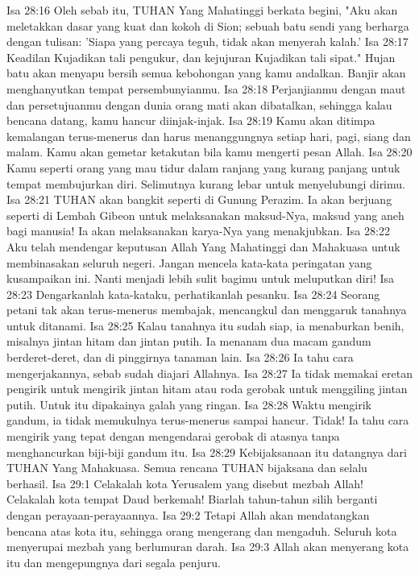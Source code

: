Isa 28:16  Oleh sebab itu, TUHAN Yang Mahatinggi berkata begini, "Aku akan meletakkan dasar yang kuat dan kokoh di Sion; sebuah batu sendi yang berharga dengan tulisan: 'Siapa yang percaya teguh, tidak akan menyerah kalah.'
Isa 28:17  Keadilan Kujadikan tali pengukur, dan kejujuran Kujadikan tali sipat." Hujan batu akan menyapu bersih semua kebohongan yang kamu andalkan. Banjir akan menghanyutkan tempat persembunyianmu.
Isa 28:18  Perjanjianmu dengan maut dan persetujuanmu dengan dunia orang mati akan dibatalkan, sehingga kalau bencana datang, kamu hancur diinjak-injak.
Isa 28:19  Kamu akan ditimpa kemalangan terus-menerus dan harus menanggungnya setiap hari, pagi, siang dan malam. Kamu akan gemetar ketakutan bila kamu mengerti pesan Allah.
Isa 28:20  Kamu seperti orang yang mau tidur dalam ranjang yang kurang panjang untuk tempat membujurkan diri. Selimutnya kurang lebar untuk menyelubungi dirimu.
Isa 28:21  TUHAN akan bangkit seperti di Gunung Perazim. Ia akan berjuang seperti di Lembah Gibeon untuk melaksanakan maksud-Nya, maksud yang aneh bagi manusia! Ia akan melaksanakan karya-Nya yang menakjubkan.
Isa 28:22  Aku telah mendengar keputusan Allah Yang Mahatinggi dan Mahakuasa untuk membinasakan seluruh negeri. Jangan mencela kata-kata peringatan yang kusampaikan ini. Nanti menjadi lebih sulit bagimu untuk meluputkan diri!
Isa 28:23  Dengarkanlah kata-kataku, perhatikanlah pesanku.
Isa 28:24  Seorang petani tak akan terus-menerus membajak, mencangkul dan menggaruk tanahnya untuk ditanami.
Isa 28:25  Kalau tanahnya itu sudah siap, ia menaburkan benih, misalnya jintan hitam dan jintan putih. Ia menanam dua macam gandum berderet-deret, dan di pinggirnya tanaman lain.
Isa 28:26  Ia tahu cara mengerjakannya, sebab sudah diajari Allahnya.
Isa 28:27  Ia tidak memakai eretan pengirik untuk mengirik jintan hitam atau roda gerobak untuk menggiling jintan putih. Untuk itu dipakainya galah yang ringan.
Isa 28:28  Waktu mengirik gandum, ia tidak memukulnya terus-menerus sampai hancur. Tidak! Ia tahu cara mengirik yang tepat dengan mengendarai gerobak di atasnya tanpa menghancurkan biji-biji gandum itu.
Isa 28:29  Kebijaksanaan itu datangnya dari TUHAN Yang Mahakuasa. Semua rencana TUHAN bijaksana dan selalu berhasil.
Isa 29:1  Celakalah kota Yerusalem yang disebut mezbah Allah! Celakalah kota tempat Daud berkemah! Biarlah tahun-tahun silih berganti dengan perayaan-perayaannya.
Isa 29:2  Tetapi Allah akan mendatangkan bencana atas kota itu, sehingga orang mengerang dan mengaduh. Seluruh kota menyerupai mezbah yang berlumuran darah.
Isa 29:3  Allah akan menyerang kota itu dan mengepungnya dari segala penjuru.
